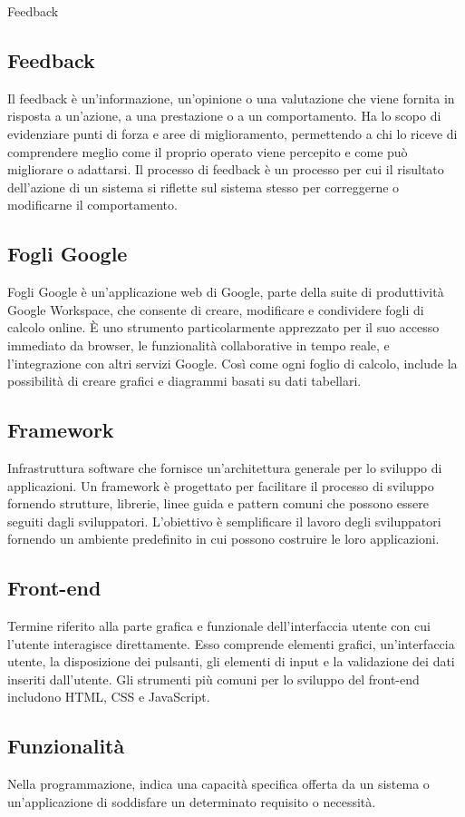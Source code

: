 \hypertarget{sec:feedback}{Feedback}
\subsection*{Feedback}
Il feedback è un'informazione, un'opinione o una valutazione che viene fornita in risposta a un'azione, a una prestazione o a un 
comportamento. Ha lo scopo di evidenziare punti di forza e aree di miglioramento, permettendo a chi lo riceve di comprendere meglio come il 
proprio operato viene percepito e come può migliorare o adattarsi. Il processo di feedback è un processo per cui il risultato dell’azione 
di un sistema si riflette sul sistema stesso per correggerne o modificarne il comportamento.

\subsection*{Fogli Google}
Fogli Google è un'applicazione web di Google, parte della suite di produttività Google Workspace, che consente di creare, modificare e condividere fogli 
di calcolo online. È uno strumento particolarmente apprezzato per il suo accesso immediato da browser, le funzionalità collaborative in tempo reale, e 
l'integrazione con altri servizi Google. Così come ogni foglio di calcolo, include la possibilità di creare grafici e diagrammi basati su dati tabellari.

\hypertarget{sec:framework}{}
\subsection*{Framework}
Infrastruttura software che fornisce un’architettura generale per lo sviluppo di applicazioni. Un framework è progettato per facilitare il processo di 
sviluppo fornendo strutture, librerie, linee guida e pattern comuni che possono essere seguiti dagli sviluppatori. L’obiettivo è semplificare il lavoro 
degli sviluppatori fornendo un ambiente predefinito in cui possono costruire le loro applicazioni.

\hypertarget{sec:front-end}{}
\subsection*{Front-end}
Termine riferito alla parte grafica e funzionale dell’interfaccia utente con cui l’utente interagisce direttamente. 
Esso comprende elementi grafici, un’interfaccia utente, la disposizione dei pulsanti, gli elementi di input e la 
validazione dei dati inseriti dall’utente. Gli strumenti più comuni per lo sviluppo del front-end includono HTML, 
CSS e JavaScript.

\hypertarget{sec:funzionalità}{}
\subsection*{Funzionalità}
Nella programmazione, indica una capacità specifica offerta da un sistema o un'applicazione di soddisfare un determinato requisito o necessità.

\newpage